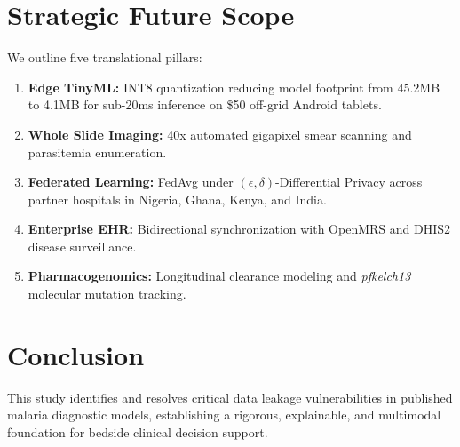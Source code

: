 \documentclass[10pt,journal,compsoc]{IEEEtran}
\begin{document}
\section{Strategic Future Scope}
We outline five translational pillars:
\begin{enumerate}
    \item \textbf{Edge TinyML:} INT8 quantization reducing model footprint from 45.2MB to 4.1MB for sub-20ms inference on \$50 off-grid Android tablets.
    \item \textbf{Whole Slide Imaging:} 40x automated gigapixel smear scanning and parasitemia enumeration.
    \item \textbf{Federated Learning:} FedAvg under $(\epsilon, \delta)$-Differential Privacy across partner hospitals in Nigeria, Ghana, Kenya, and India.
    \item \textbf{Enterprise EHR:} Bidirectional synchronization with OpenMRS and DHIS2 disease surveillance.
    \item \textbf{Pharmacogenomics:} Longitudinal clearance modeling and \textit{pfkelch13} molecular mutation tracking.
\end{enumerate}

\section{Conclusion}
This study identifies and resolves critical data leakage vulnerabilities in published malaria diagnostic models, establishing a rigorous, explainable, and multimodal foundation for bedside clinical decision support.



\end{document}
